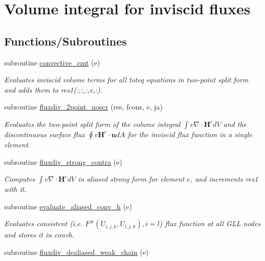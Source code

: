 \hypertarget{group__convhvol}{\section{Volume integral for inviscid fluxes}
\label{group__convhvol}
}
\subsection*{Functions/\-Subroutines}
\begin{DoxyCompactItemize}
\item 
subroutine \hyperlink{group__convhvol_ga77e7d7a46950fcbbf072e8e900cee272}{convective\-\_\-cmt} (e)
\begin{DoxyCompactList}\small\item\em Evaluates inviscid volume terms for all toteq equations in two-\/point split form and adds them to res1(\-:,\-:,\-:,e,\-:). \end{DoxyCompactList}\item 
subroutine \hyperlink{group__convhvol_ga72c1cbe51bc537e14ec8927e62f0e3f3}{fluxdiv\-\_\-2point\-\_\-noscr} (res, fcons, e, ja)
\begin{DoxyCompactList}\small\item\em Evaluates the two-\/point split form of the volume integral $\int v \nabla\cdot\mathbf{H}^c dV$ and the discontinuous surface flux $\oint v \mathbf{H}^c\cdot\mathbf{n} dA$ for the inviscid flux function in a single element. \end{DoxyCompactList}\item 
\hypertarget{group__convhvol_gab4831bb28a78e1c8fd3ec09854bd15ad}{subroutine \hyperlink{group__convhvol_gab4831bb28a78e1c8fd3ec09854bd15ad}{fluxdiv\-\_\-strong\-\_\-contra} (e)}\label{group__convhvol_gab4831bb28a78e1c8fd3ec09854bd15ad}

\begin{DoxyCompactList}\small\item\em Computes $\int v \nabla\cdot\mathbf{H}^c dV$ in aliased strong form for element $e$, and increments res1 with it. \end{DoxyCompactList}\item 
subroutine \hyperlink{group__convhvol_gad9d70d83f1184d25495812d637698102}{evaluate\-\_\-aliased\-\_\-conv\-\_\-h} (e)
\begin{DoxyCompactList}\small\item\em Evaluates consistent (i.\-e. $F^{\#}(U_{i,j,k},U_{l,j,k}),i=l$) flux function at all G\-L\-L nodes and stores it in convh. \end{DoxyCompactList}\item 
\hypertarget{group__convhvol_ga89ba8fe53f8afc523597773aca62a270}{subroutine \hyperlink{group__convhvol_ga89ba8fe53f8afc523597773aca62a270}{fluxdiv\-\_\-dealiased\-\_\-weak\-\_\-chain} (e)}\label{group__convhvol_ga89ba8fe53f8afc523597773aca62a270}


\end{DoxyCompactItemize}

